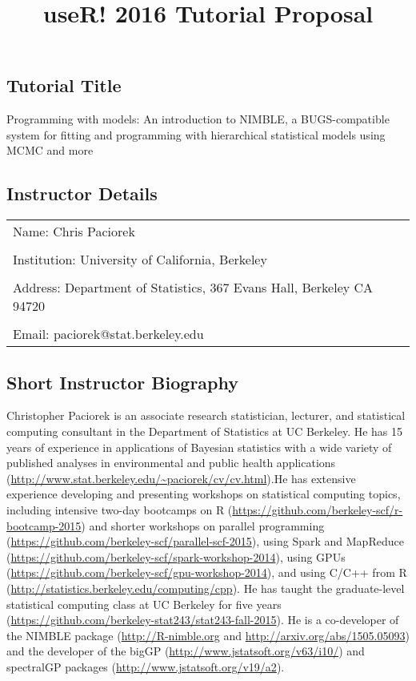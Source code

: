 \documentclass[]{article}
\title{useR! 2016 Tutorial Proposal}
\author{}
\date{}
\begin{document}
\maketitle



\subsection{Tutorial Title}\label{tutorial-title}

Programming with models: An introduction to NIMBLE, a BUGS-compatible system for fitting and programming with hierarchical statistical models using MCMC and more

\subsection{Instructor Details}\label{instructor-details}

\begin{longtable}[c]{@{}ll@{}}
\toprule
Name: Chris Paciorek &\tabularnewline
&\tabularnewline
Institution: University of California, Berkeley&\tabularnewline
&\tabularnewline
Address: Department of Statistics, 367 Evans Hall, Berkeley CA 94720 &\tabularnewline
&\tabularnewline
Email: paciorek@stat.berkeley.edu &\tabularnewline
\bottomrule
\end{longtable}

\subsection{Short Instructor
Biography}\label{short-instructor-biography}

Christopher Paciorek is an associate research statistician, lecturer, and statistical computing consultant in the Department of Statistics at UC Berkeley. He has 15 years of experience in applications of Bayesian statistics with a wide variety of published analyses in environmental and public health applications (\url{http://www.stat.berkeley.edu/~paciorek/cv/cv.html}).He has extensive experience developing and presenting workshops on statistical computing topics, including intensive two-day bootcamps on R (\url{https://github.com/berkeley-scf/r-bootcamp-2015}) and  shorter workshops on parallel programming (\url{https://github.com/berkeley-scf/parallel-scf-2015}), using Spark and MapReduce (\url{https://github.com/berkeley-scf/spark-workshop-2014}), using GPUs (\url{https://github.com/berkeley-scf/gpu-workshop-2014}), and using C/C++ from R (\url{http://statistics.berkeley.edu/computing/cpp}). He has taught the graduate-level statistical computing class at UC Berkeley for five years (\url{https://github.com/berkeley-stat243/stat243-fall-2015}). He is a co-developer of the NIMBLE package (\url{http://R-nimble.org} and \url{http://arxiv.org/abs/1505.05093}) and the developer of the bigGP (\url{http://www.jstatsoft.org/v63/i10/}) and spectralGP packages (\url{http://www.jstatsoft.org/v19/a2}).  
\end{document}
